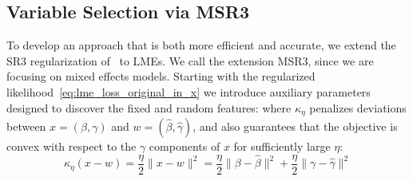 

\subsection{Variable Selection via MSR3}\label{sec:MSR3}

To develop an approach that is both more efficient and accurate, we extend the SR3 regularization of~\cite{Zheng2019SR3} to LMEs. 
We call the extension MSR3, since we are focusing on mixed effects models. 
Starting with the regularized likelihood~\eqref{eq:lme_loss_original_in_x} we introduce auxiliary parameters designed to discover the fixed and random features: 
where $\kappa_\eta$ penalizes deviations between $x = (\beta, \gamma)$ and $w = (\hat \beta, \hat \gamma)$, and also guarantees that the objective is convex with respect to the $\gamma$
components of $x$ for sufficiently large $\eta$: \\
\begin{equation}
\label{eq:kappa}
\kappa_\eta (x-w) = \frac{\eta}{2}\|x-w\|^2 = 
\frac{\eta}{2}\| \beta - \hat \beta \|^2 + 
\frac{\eta}{2}\| \gamma - \hat \gamma\|^2
\end{equation}

